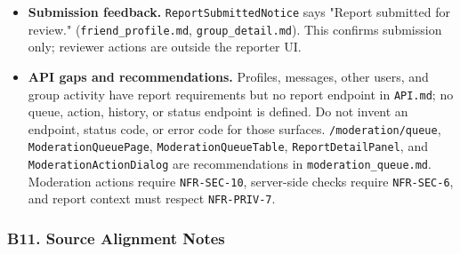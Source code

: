 \documentclass[12pt]{article}
\begin{document}
\begin{itemize}
\item \textbf{Submission feedback.} \texttt{ReportSubmittedNotice} says "Report submitted for review." (\texttt{friend\_profile.md}, \texttt{group\_detail.md}). This confirms submission only; reviewer actions are outside the reporter UI.
\item \textbf{API gaps and recommendations.} Profiles, messages, other users, and group activity have report requirements but no report endpoint in \texttt{API.md}; no queue, action, history, or status endpoint is defined. Do not invent an endpoint, status code, or error code for those surfaces. \texttt{/moderation/queue}, \texttt{ModerationQueuePage}, \texttt{ModerationQueueTable}, \texttt{ReportDetailPanel}, and \texttt{ModerationActionDialog} are recommendations in \texttt{moderation\_queue.md}. Moderation actions require \texttt{NFR-SEC-10}, server-side checks require \texttt{NFR-SEC-6}, and report context must respect \texttt{NFR-PRIV-7}.
\end{itemize}
\par\medskip

\hypertarget{sec:b11-source-alignment-notes}{}
\subsubsection*{B11. Source Alignment Notes}
\par\medskip
\end{document}
